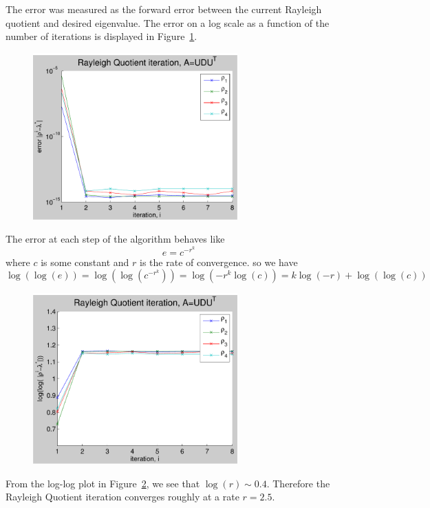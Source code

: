 \documentclass[11pt]{article} %
\begin{document}
The error was measured as the forward error between the current Rayleigh quotient and desired eigenvalue. The error on a log scale as a function of the number of iterations is displayed in Figure~\ref{fig:p3b}.
\begin{figure}[h!]
  \centering
    \includegraphics[width=0.7\textwidth]{p3b}
  \caption{}
\label{fig:p3b}
\end{figure}

The error at each step of the algorithm behaves like
\begin{equation}
e = c^{-r^k}
\end{equation}
where $c$ is some constant and $r$ is the rate of convergence. 
so we have
\begin{equation}
\log(\log(e)) = \log(\log(c^{-r^k})) = \log(-r^k \log(c)) = k \log(-r )+ \log(\log (c))
\end{equation}

\begin{figure}[h!]
  \centering
    \includegraphics[width=0.7\textwidth]{p3blog}
  \caption{}
\label{fig:p3blog}
\end{figure}
From the log-log plot in Figure~\ref{fig:p3blog}, we see that $\log(r) \sim 0.4$. Therefore the Rayleigh Quotient iteration converges roughly at a rate $r = 2.5$.
\end{document}
